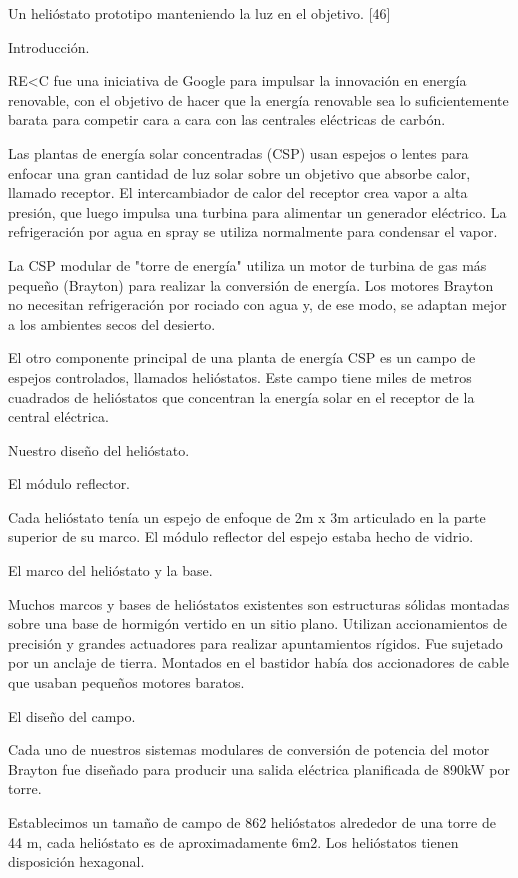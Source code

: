 \documentclass[12pt]{article}
\begin{document}
Un helióstato prototipo manteniendo la luz en el objetivo. [46]

Introducción.

RE\textless C fue una iniciativa de Google para impulsar la innovación en energía renovable, con el objetivo de hacer que la energía renovable sea lo suficientemente barata para competir cara a cara con las centrales eléctricas de carbón.

Las plantas de energía solar concentradas (CSP) usan espejos o lentes para enfocar una gran cantidad de luz solar sobre un objetivo que absorbe calor, llamado receptor. El intercambiador de calor del receptor crea vapor a alta presión, que luego impulsa una turbina para alimentar un generador eléctrico. La refrigeración por agua en spray se utiliza normalmente para condensar el vapor.

La CSP modular de "torre de energía" utiliza un motor de turbina de gas más pequeño (Brayton) para realizar la conversión de energía. Los motores Brayton no necesitan refrigeración por rociado con agua y, de ese modo, se adaptan mejor a los ambientes secos del desierto.

El otro componente principal de una planta de energía CSP es un campo de espejos controlados, llamados helióstatos. Este campo tiene miles de metros cuadrados de helióstatos que concentran la energía solar en el receptor de la central eléctrica.

Nuestro diseño del helióstato.

El módulo reflector.

Cada helióstato tenía un espejo de enfoque de 2m x 3m articulado en la parte superior de su marco. El módulo reflector del espejo estaba hecho de vidrio.

El marco del helióstato y la base.

Muchos marcos y bases de helióstatos existentes son estructuras sólidas montadas sobre una base de hormigón vertido en un sitio plano. Utilizan accionamientos de precisión y grandes actuadores para realizar apuntamientos rígidos. Fue sujetado por un anclaje de tierra. Montados en el bastidor había dos accionadores de cable que usaban pequeños motores baratos.

El diseño del campo.

Cada uno de nuestros sistemas modulares de conversión de potencia del motor Brayton fue diseñado para producir una salida eléctrica planificada de 890kW por torre.

Establecimos un tamaño de campo de 862 helióstatos alrededor de una torre de 44 m, cada helióstato es de aproximadamente 6m2. Los helióstatos tienen disposición hexagonal.
\end{document}

